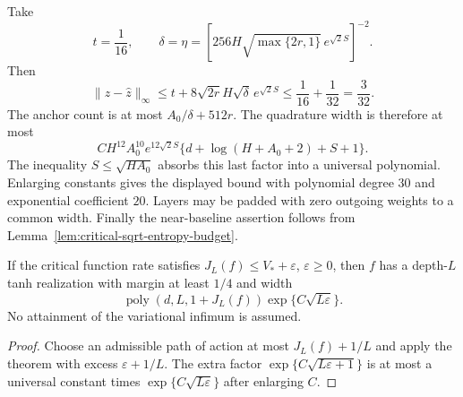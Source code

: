 Take
\[
 t=\frac1{16},\qquad
 \delta=\eta=
 \left[256H\sqrt{\max\{2r,1\}}\,e^{\sqrt2S}\right]^{-2}.
\]
Then
\[
 \|z-\widehat z\|_\infty
 \le t+8\sqrt{2r}H\sqrt\delta\,e^{\sqrt2S}
 \le\frac1{16}+\frac1{32}=\frac3{32}.
\]
The anchor count is at most $A_0/\delta+512r$.
The quadrature width is therefore at most
\[
 C H^{12}A_0^{10}e^{12\sqrt2S}
       \{d+\log(H+A_0+2)+S+1\}.
\]
The inequality
$S\le\sqrt{HA_0}$ absorbs this last factor into a universal
polynomial. Enlarging constants gives the displayed bound with
polynomial degree $30$ and exponential coefficient $20$.
Layers may be padded with zero outgoing weights to a common width.
Finally the near-baseline assertion follows from
Lemma~\ref{lem:critical-sqrt-entropy-budget}.


\begin{corollary}
\label{cor:anchored-critical-rate-compression}
If the critical function rate satisfies $J_L(f)\le V_*+\varepsilon$,
$\varepsilon\ge0$, then $f$ has a depth-$L$ tanh realization with
margin at least $1/4$ and width
\[
 \operatorname{poly}(d,L,1+J_L(f))\exp\{C\sqrt{L\varepsilon}\}.
\]
No attainment of the variational infimum is assumed.
\end{corollary}

\begin{proof}
Choose an admissible path of action at most $J_L(f)+1/L$ and apply
the theorem with excess $\varepsilon+1/L$. The extra factor
$\exp\{C\sqrt{L\varepsilon+1}\}$ is at most a universal constant
times $\exp\{C\sqrt{L\varepsilon}\}$ after enlarging $C$.
\end{proof}

